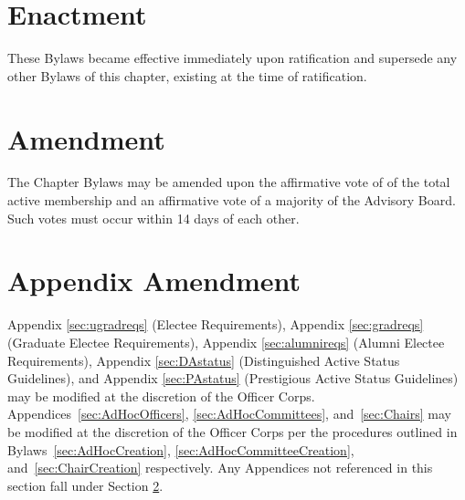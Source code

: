 \section{Enactment}
These Bylaws became effective immediately upon ratification and supersede any other Bylaws of this chapter, existing at the time of ratification.
\section{Amendment} \label{sec:bylawAmendment}
The Chapter Bylaws may be amended upon the affirmative vote of  of the total active membership and an affirmative vote of a majority of the Advisory Board.
Such votes must occur within 14 days of each other.
\section{Appendix Amendment}
Appendix \ref{sec:ugradreqs} (Electee Requirements), Appendix \ref{sec:gradreqs} (Graduate Electee Requirements), Appendix \ref{sec:alumnireqs} (Alumni Electee Requirements), Appendix \ref{sec:DAstatus} (Distinguished Active Status Guidelines), and Appendix \ref{sec:PAstatus} (Prestigious Active Status Guidelines) may be modified at the discretion of the Officer Corps.
Appendices~\ref{sec:AdHocOfficers}, \ref{sec:AdHocCommittees}, and~\ref{sec:Chairs} may be modified at the discretion of the Officer Corps per the procedures outlined in Bylaws~\ref{sec:AdHocCreation}, \ref{sec:AdHocCommitteeCreation}, and~\ref{sec:ChairCreation} respectively.
Any Appendices not referenced in this section fall under Section \ref{sec:bylawAmendment}.

